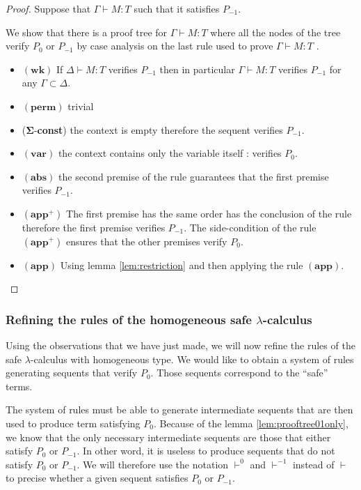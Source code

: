 \begin{proof}
Suppose that $\Gamma \vdash M : T$ such that it satisfies $P_{-1}$.

We show that there is a proof tree for
$\Gamma \vdash M : T$ where all the nodes of the tree verify $P_0$
or $P_{-1}$ by case analysis on the last rule used to prove $\Gamma \vdash M : T$ .

\begin{itemize}
\item $\mathbf{(wk)}$ If $\Delta \vdash M : T$ verifies $P_{-1}$ then in particular $\Gamma
\vdash M : T$ verifies $P_{-1}$ for any $\Gamma \subset \Delta$.

\item $\mathbf{(perm)}$ trivial

\item ($\mathbf{\Sigma}$-\textbf{const}) the context is empty therefore the sequent verifies $P_{-1}$.

\item $\mathbf{(var)}$ the context contains only the variable itself : verifies $P_0$.

\item $\mathbf{(abs)}$ the second premise of the rule guarantees that the first
premise verifies $P_{-1}$.

\item $\mathbf{(app^+)}$ The first premise has the same order has the
conclusion of the rule therefore the first premise verifies
$P_{-1}$. The side-condition of the rule $\mathbf{(app^+)}$ ensures that the other premises verify $P_0$.

\item $\mathbf{(app)}$ Using lemma \ref{lem:restriction} and then applying the rule $\mathbf{(app)}$.

\end{itemize}
\end{proof}

\subsubsection{Refining the rules of the homogeneous safe $\lambda$-calculus}

Using the observations that we have just made, we will now refine the rules
of the safe $\lambda$-calculus with homogeneous type. We would like to obtain a system
of rules generating sequents that verify $P_0$. Those sequents correspond to the ``safe'' terms.

The system of rules must be able to generate intermediate sequents that are then used to produce term
satisfying $P_0$. Because of the lemma \ref{lem:prooftree01only}, we know that the only necessary intermediate sequents
are those that either satisfy $P_0$ or $P_{-1}$. In other word, it is useless to produce sequents that do not satisfy
$P_0$ or $P_{-1}$. We will therefore use the notation $\vdash^0$ and $\vdash^{-1}$ instead of $\vdash$ to precise
whether a given sequent satisfies $P_0$ or $P_{-1}$.

